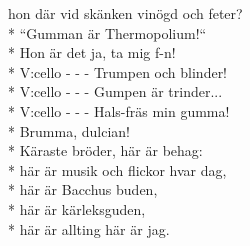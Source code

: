\begin{SongText}
\begin{SongVerse}
        hon där vid skänken vinögd och feter?\\*%
        “Gumman är Thermopolium!“\\*%
        Hon är det ja, ta mig f-n!\\*%
        V:cello - - - Trumpen och blinder!\\*%
        V:cello - - - Gumpen är trinder...\\*%
        V:cello - - - Hals-fräs min gumma!\\*%
        Brumma, dulcian!\\*%
        Käraste bröder, här är behag:\\*%
        här är musik och flickor hvar dag,\\*%
        här är Bacchus buden,\\*%
        här är kärleksguden,\\*%
        här är allting här är jag. 
    \end{SongVerse}
\end{SongText}  